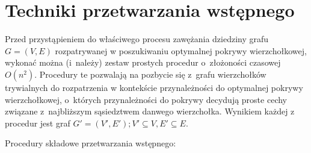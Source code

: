 \section{Techniki przetwarzania wstępnego}\label{Section_preprocessing}

Przed przystąpieniem do właściwego procesu zawężania dziedziny grafu $G=(V,E)$
rozpatrywanej w poszukiwaniu optymalnej pokrywy wierzchołkowej, wykonać można 
(i~należy) zestaw prostych procedur o~złożoności czasowej $O(n^2)$.
Procedury te pozwalają na pozbycie się z~grafu wierzchołków trywialnych do 
rozpatrzenia w kontekście przynależności do optymalnej pokrywy wierzchołkowej,
o~których przynależności do pokrywy decydują proste cechy związane
z~najbliższym sąsiedztwem danwego wierzchołka.
Wynikiem każdej z procedur jest graf $G\prime=(V\prime, E\prime); V\prime
\subseteq V, E\prime \subseteq E$.



Procedury składowe przetwarzania wstępnego:


